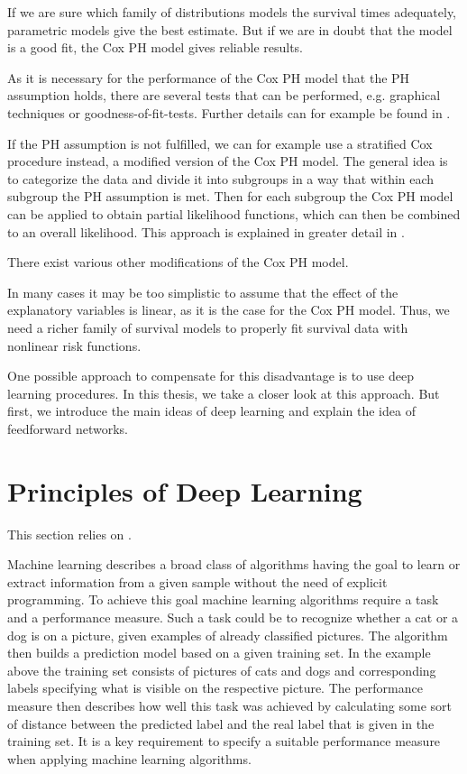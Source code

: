 \documentclass[12pt, a4paper]{scrartcl}
\theoremstyle{definition}
\theoremstyle{plain}
\numberwithin{equation}{section}
\numberwithin{figure}{section}
\numberwithin{table}{section}
\begin{document}
	If we are sure which family of distributions models the survival times adequately, parametric models give the best estimate.
	But if we are in doubt that the model is a good fit, the Cox PH model gives reliable results.
	
	As it is necessary for the performance of the Cox PH model that the PH assumption holds, there are several tests that can be performed, e.g. graphical techniques or goodness-of-fit-tests.
	Further details can for example be found in \citet*[Chapter~3]{sabook}.
	
	If the PH assumption is not fulfilled, we can for example use a stratified Cox procedure instead, a modified version of the Cox PH model.
	The general idea is to categorize the data and divide it into subgroups in a way that within each subgroup the PH assumption is met.
	Then for each subgroup the Cox PH model can be applied to obtain partial likelihood functions, which can then be combined to an overall likelihood.
	This approach is explained in greater detail in \citet*[Chapter~5]{sabook}.
	
	There exist various other modifications of the Cox PH model.
	
	In many cases it may be too simplistic to assume that the effect of the explanatory variables is linear, as it is the case for the Cox PH model.
	Thus, we need a richer family of survival models to properly fit survival data with nonlinear risk functions.
	
	One possible approach to compensate for this disadvantage is to use deep learning procedures.
	In this thesis, we take a closer look at this approach.
	But first, we introduce the main ideas of deep learning and explain the idea of feedforward networks.
	\newpage
	
	\section{Principles of Deep Learning}\label{basicsdl}
	This section relies on \citet*{deeplbook}.
	
	Machine learning describes a broad class of algorithms having the goal to learn or extract information from a given sample without the need of explicit programming.
	To achieve this goal machine learning algorithms require a task and a performance measure.
	Such a task could be to recognize whether a cat or a dog is on a picture, given examples of already classified pictures.
	The algorithm then builds a prediction model based on a given training set.
	In the example above the training set consists of pictures of cats and dogs and corresponding labels specifying what is visible on the respective picture.
	The performance measure then describes how well this task was achieved by calculating some sort of distance between the predicted label and the real label that is given in the training set.
	It is a key requirement to specify a suitable performance measure when applying machine learning algorithms.
	
\end{document}
